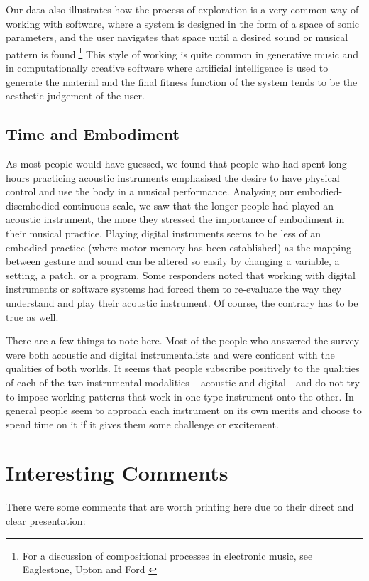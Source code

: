 Our data also illustrates how the process of exploration is a very common way of
working with software, where a system is designed in the form of a space of sonic
parameters, and the user navigates that space until a desired sound or musical
pattern is found.\footnote{For a discussion of compositional processes in
electronic music, see Eaglestone, Upton and Ford \cite{Eaglestone:2005}} This style of working is
quite common in generative music and in computationally creative software where
artificial intelligence is used to generate the material and the final fitness
function of the system tends to be the aesthetic judgement of the user.

\subsection{Time and Embodiment}
As most people would have guessed, we found that people who
had spent long hours practicing acoustic instruments emphasised the desire to
have physical control and use the body in a musical performance. Analysing our
embodied-disembodied continuous scale, we saw that the longer people had played
an acoustic instrument, the more they stressed the importance of embodiment in
their musical practice. Playing digital instruments seems to be less of an
embodied practice (where motor-memory has been established) as the mapping
between gesture and sound can be altered so easily by changing a variable, a
setting, a patch, or a program. Some responders noted that working with digital
instruments or software systems had forced them to re-evaluate the way they
understand and play their acoustic instrument. Of course, the contrary has to be
true as well.

There are a few things to note here. Most of the people who
answered the survey were both acoustic and digital instrumentalists and were
confident with the qualities of both worlds. It seems that people subscribe
positively to the qualities of each of the two instrumental modalities --
acoustic and digital---and do not try to impose working patterns that work in
one type instrument onto the other. In general people seem to approach each
instrument on its own merits and choose to spend time on it if it gives them some
challenge or excitement.

\section{Interesting Comments}

There were some comments that are worth printing here due to their direct and
clear presentation:

